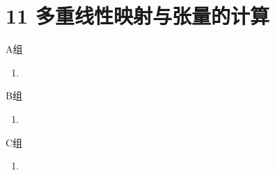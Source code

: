 \section*{11 多重线性映射与张量的计算}

\vspace{2ex}

\centerline{\heiti A组}
\begin{enumerate}
    \item
\end{enumerate}

\centerline{\heiti B组}
\begin{enumerate}
    \item
\end{enumerate}

\centerline{\heiti C组}
\begin{enumerate}
    \item
\end{enumerate}

\clearpage

